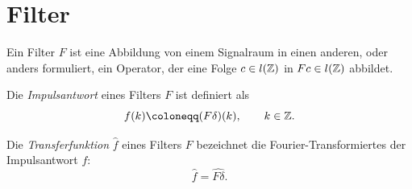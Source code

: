 \section{Filter}

\begin{definition}[Filter]
Ein Filter $ F $ ist eine Abbildung von einem Signalraum in einen anderen, oder anders formuliert, 
ein Operator, der eine Folge $ c \in l(\mathbb{Z}) $ in $ Fc \in l(\mathbb{Z}) $ abbildet.
\end{definition}

\begin{definition}[Impulsantwort]
Die \emph{Impulsantwort} eines Filters $ F $ ist definiert als
\[
  f(k) \coloneqq (F \delta)(k), \qquad k \in \Z.
\]
\end{definition}

\begin{definition}[Transferfunktion]
Die \emph{Transferfunktion} $ \widehat{f} $ eines Filters $ F $ bezeichnet die
Fourier-Transformiertes der Impulsantwort $ f $:
\[
  \widehat{f} = \widehat{F\delta}.
\]
\end{definition}

